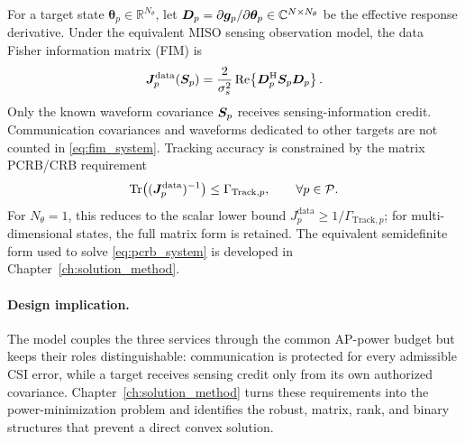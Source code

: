 For a target state $\boldsymbol{\theta}_p\in\mathbb{R}^{N_\theta}$, let
$\bm{D}_p=\partial\bm{g}_p/\partial\boldsymbol{\theta}_p
\in\mathbb{C}^{N\times N_\theta}$ be the effective response derivative.
Under the equivalent MISO sensing observation model, the data Fisher
information matrix (FIM) is
\begin{equation}\label{eq:fim_system}
    \bm{J}_p^{\mathrm{data}}(\bm{S}_p)=
    \frac{2}{\sigma_s^2}\operatorname{Re}\!\left\{
    \bm{D}_p^{\mathrm{H}}\bm{S}_p\bm{D}_p\right\}.
\end{equation}
Only the known waveform covariance $\bm{S}_p$ receives sensing-information
credit.  Communication covariances and waveforms dedicated to other targets
are not counted in \eqref{eq:fim_system}.  Tracking accuracy is constrained
by the matrix PCRB/CRB requirement
\begin{equation}\label{eq:pcrb_system}
    \operatorname{Tr}\!\left((\bm{J}_p^{\mathrm{data}})^{-1}\right)
    \leq\Gamma_{\mathrm{Track},p},\qquad\forall p\in\mathcal{P}.
\end{equation}
For $N_\theta=1$, this reduces to the scalar lower bound
$J_p^{\mathrm{data}}\geq1/\Gamma_{\mathrm{Track},p}$; for multi-dimensional
states, the full matrix form is retained.  The equivalent semidefinite form
used to solve \eqref{eq:pcrb_system} is developed in Chapter~\ref{ch:solution_method}.

\paragraph{Design implication.}
The model couples the three services through the common AP-power budget but
keeps their roles distinguishable: communication is protected for every
admissible CSI error, while a target receives sensing credit only from its own
authorized covariance. Chapter~\ref{ch:solution_method} turns these
requirements into the power-minimization problem and identifies the robust,
matrix, rank, and binary structures that prevent a direct convex solution.
